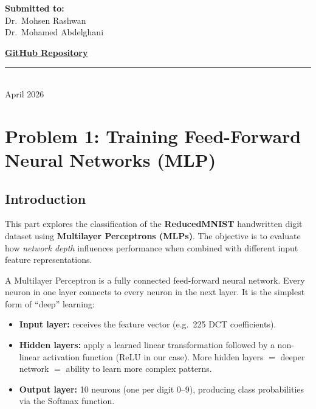 \documentclass[12pt, a4paper]{article}
\begin{document}
\begin{titlepage}
\begin{center}
        \vspace{2cm}

        \textbf{Submitted to:} \\
        Dr.\ Mohsen Rashwan \\
        Dr.\ Mohamed Abdelghani \\
    \end{center}

    \vfill

    \faGithub\hspace{0.4em}\href{https://github.com/al-sakka/NN_Assignments/tree/main/Assignment_2}{\textbf{GitHub Repository}}

    \vfill
    \rule{0.3\linewidth}{0.2mm} \\
    {\large April 2026}
\end{titlepage}

\tableofcontents
\newpage

\section{Problem 1: Training Feed-Forward Neural Networks (MLP)}

\subsection{Introduction}

This part explores the classification of the \textbf{ReducedMNIST} handwritten digit dataset using
\textbf{Multilayer Perceptrons (MLPs)}.  The objective is to evaluate how \emph{network depth}
influences performance when combined with different input feature representations.

A Multilayer Perceptron is a fully connected feed-forward neural network.  Every neuron in one
layer connects to every neuron in the next layer.  It is the simplest form of ``deep'' learning:
\begin{itemize}
    \item \textbf{Input layer:} receives the feature vector (e.g.\ 225 DCT coefficients).
    \item \textbf{Hidden layers:} apply a learned linear transformation followed by a non-linear
          activation function (ReLU in our case).  More hidden layers $=$ deeper network $=$
          ability to learn more complex patterns.
    \item \textbf{Output layer:} 10 neurons (one per digit 0--9), producing class probabilities via
          the Softmax function.
\end{itemize}
\end{document}
